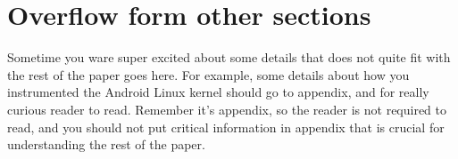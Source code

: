 \section{Overflow form other sections}
\label{sec:set-diff-dodis}
Sometime you ware super excited about some details that does not quite fit with
the rest of the paper goes here. For example, some details about how you
instrumented the Android Linux kernel should go to appendix, and for really
curious reader to read. Remember it's appendix, so the reader is not required to
read, and you should not put critical information in appendix that is crucial
for understanding the rest of the paper.




